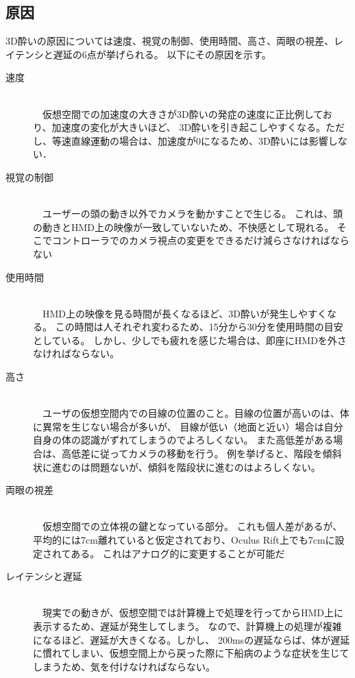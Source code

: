 \documentclass{jsarticle}
\begin{document}
\subsection{原因}
3D酔いの原因については速度、視覚の制御、使用時間、高さ、両眼の視差、レイテンシと遅延の6点が挙げられる。
以下にその原因を示す。
\begin{description}
 \item[速度]\mbox{}\\
	    　仮想空間での加速度の大きさが3D酔いの発症の速度に正比例しており、加速度の変化が大きいほど、
      3D酔いを引き起こしやすくなる。ただし、等速直線運動の場合は、加速度が0になるため、3D酔いには影響しない．

  \item[視覚の制御]\mbox{}\\
	    　ユーザーの頭の動き以外でカメラを動かすことで生じる。
      これは、頭の動きとHMD上の映像が一致していないため、不快感として現れる。
      そこでコントローラでのカメラ視点の変更をできるだけ減らさなければならない

  \item[使用時間]\mbox{}\\
      　HMD上の映像を見る時間が長くなるほど、3D酔いが発生しやすくなる。
      この時間は人それぞれ変わるため、15分から30分を使用時間の目安としている。
      しかし、少しでも疲れを感じた場合は、即座にHMDを外さなければならない。

  \item[高さ]\mbox{}\\
      　ユーザの仮想空間内での目線の位置のこと。目線の位置が高いのは、体に異常を生じない場合が多いが、
      目線が低い（地面と近い）場合は自分自身の体の認識がずれてしまうのでよろしくない。
      また高低差がある場合は、高低差に従ってカメラの移動を行う。
      例を挙げると、階段を傾斜状に進むのは問題ないが、傾斜を階段状に進むのはよろしくない。

  \item[両眼の視差]\mbox{}\\
      　仮想空間での立体視の鍵となっている部分。
      これも個人差があるが、平均的には7cm離れていると仮定されており、Oculus Rift上でも7cmに設定されてある。
      これはアナログ的に変更することが可能だ

  \item[レイテンシと遅延]\mbox{}\\
      　現実での動きが、仮想空間では計算機上で処理を行ってからHMD上に表示するため、遅延が発生してしまう。
      なので、計算機上の処理が複雑になるほど、遅延が大きくなる。しかし、
      200msの遅延ならば、体が遅延に慣れてしまい、仮想空間上から戻った際に下船病のような症状を生じてしまうため、気を付けなければならない。
\end{description}
\end{document}
